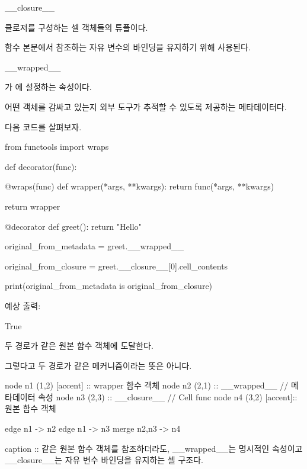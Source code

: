 \begin{dhknote}
\begin{dhksmry}[centered]
__closure__
\end{dhksmry}
\end{dhknote}

클로저를 구성하는 셀 객체들의 튜플이다.

함수 본문에서 참조하는 자유 변수의 바인딩을 유지하기 위해 사용된다.

\begin{dhknote}
\begin{dhksmry}[centered]
__wrapped__
\end{dhksmry}
\end{dhknote}

가 에 설정하는 속성이다.

어떤 객체를 감싸고 있는지 외부 도구가 추적할 수 있도록 제공하는 메타데이터다.

다음 코드를 살펴보자.

\begin{dhkcode}
from functools import wraps

def decorator(func):

    @wraps(func)
    def wrapper(*args, **kwargs):
        return func(*args, **kwargs)

    return wrapper


@decorator
def greet():
    return "Hello"


original_from_metadata = greet.__wrapped__

original_from_closure = greet.__closure__[0].cell_contents

print(original_from_metadata is original_from_closure)
\end{dhkcode}

예상 출력:

\begin{dhkzsh}
True
\end{dhkzsh}

두 경로가 같은 원본 함수 객체에 도달한다.

그렇다고 두 경로가 같은 메커니즘이라는 뜻은 아니다.

\begin{dhkgraph}[uniform]
node n1 (1,2) [accent] :: wrapper 함수 객체
node n2 (2,1) :: __wrapped__ // 메타데이터 속성
node n3 (2,3) :: __closure__ // Cell func
node n4 (3,2) [accent]:: 원본 함수 객체

edge n1 -> n2
edge n1 -> n3
merge n2,n3 -> n4

caption :: 같은 원본 함수 객체를 참조하더라도, __wrapped__는 명시적인 속성이고 __closure__는 자유 변수 바인딩을 유지하는 셀 구조다.
\end{dhkgraph}

